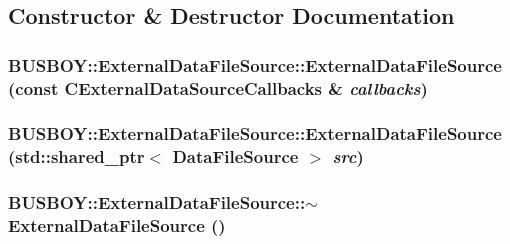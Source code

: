 \subsection{Constructor \& Destructor Documentation}
\hypertarget{classBUSBOY_1_1ExternalDataFileSource_a7b7f299b58dc0dc6c8b79db389e6adde}{
\subsubsection[{ExternalDataFileSource}]{\setlength{\rightskip}{0pt plus 5cm}BUSBOY::ExternalDataFileSource::ExternalDataFileSource (const {\bf CExternalDataSourceCallbacks} \& {\em callbacks})}}
\label{classBUSBOY_1_1ExternalDataFileSource_a7b7f299b58dc0dc6c8b79db389e6adde}
\hypertarget{classBUSBOY_1_1ExternalDataFileSource_a6351940b4d69984fc0af48930ddfe59d}{
\subsubsection[{ExternalDataFileSource}]{\setlength{\rightskip}{0pt plus 5cm}BUSBOY::ExternalDataFileSource::ExternalDataFileSource (std::shared\_\-ptr$<$ {\bf DataFileSource} $>$ {\em src})}}
\label{classBUSBOY_1_1ExternalDataFileSource_a6351940b4d69984fc0af48930ddfe59d}
\hypertarget{classBUSBOY_1_1ExternalDataFileSource_a318a095806b467165d97a23f3cbbeafd}{
\subsubsection[{$\sim$ExternalDataFileSource}]{\setlength{\rightskip}{0pt plus 5cm}BUSBOY::ExternalDataFileSource::$\sim$ExternalDataFileSource ()}}
\label{classBUSBOY_1_1ExternalDataFileSource_a318a095806b467165d97a23f3cbbeafd}


